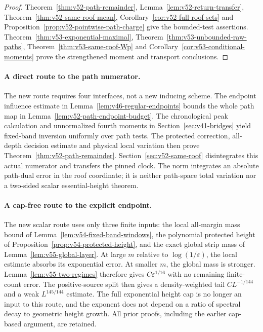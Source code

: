 \begin{proof}
Theorem~\ref{thm:v52-path-remainder}, Lemma~\ref{lem:v52-return-transfer},
Theorem~\ref{thm:v52-same-roof-mean},
Corollary~\ref{cor:v52-full-roof-sets} and
Proposition~\ref{prop:v52-pointwise-path-charge} give the bounded-test
assertions. Theorem~\ref{thm:v53-exponential-maximal},
Theorem~\ref{thm:v53-unbounded-raw-paths},
Theorem~\ref{thm:v53-same-roof-Wp} and
Corollary~\ref{cor:v53-conditional-moments} prove the strengthened
moment and transport conclusions.
\end{proof}

\paragraph{A direct route to the path numerator.}
The new route requires four interfaces, not a new inducing scheme.
The endpoint influence estimate in
Lemma~\ref{lem:v46-regular-endpoints} bounds the whole path map in
Lemma~\ref{lem:v52-path-endpoint-budget}. The chronological peak
calculation and unnormalized fourth moments in
Section~\ref{sec:v41-bridges} yield fixed-band inversion uniformly over
path tests. The protected correction, all-depth decision estimate and
physical local variation then prove
Theorem~\ref{thm:v52-path-remainder}. Section~\ref{sec:v52-same-roof}
disintegrates this actual numerator and transfers the pinned clock.
The norm integrates an absolute path-dual error in the roof coordinate;
it is neither path-space total variation nor a two-sided scalar
essential-height theorem.

\paragraph{A cap-free route to the explicit endpoint.}
The new scalar route uses only three finite inputs: the local all-margin
mass bound of Lemma~\ref{lem:v54-fixed-band-windows}, the polynomial
protected height of Proposition~\ref{prop:v54-protected-height}, and
the exact global strip mass of Lemma~\ref{lem:v55-global-layer}.
At large $m$ relative to $\log(1/\varepsilon)$, the local estimate
absorbs its exponential error. At smaller $m$, the global mass is
stronger. Lemma~\ref{lem:v55-two-regimes} therefore gives
$C\varepsilon^{1/16}$ with no remaining finite-count error.
The positive-source split then gives a density-weighted tail
$CL^{-1/144}$ and a weak $L^{145/144}$ estimate. The full exponential
height cap is no longer an input to this route, and the exponent does
not depend on a ratio of spectral decay to geometric height growth.
All prior proofs, including the earlier cap-based argument, are retained.

